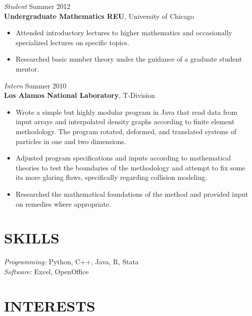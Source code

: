 \documentclass[margin, 10pt]{res} %
\begin{document}
\begin{resume}
{\sl Student} \hfill Summer 2012 \\
\textbf{Undergraduate Mathematics REU}, University of Chicago 
\begin{itemize} 
\item Attended introductory lectures to higher mathematics and occasionally specialized lectures on specific topics.
\item Researched basic number theory under the guidance of a graduate student mentor.  
\end{itemize} 

{\sl Intern} \hfill Summer 2010 \\
\textbf{Los Alamos National Laboratory}, T-Division
\begin{itemize}
\item Wrote a simple but highly modular program in Java that read data from input arrays and interpolated density graphs according to finite element methodology. The program rotated, deformed, and translated systems of particles in one and two dimensions.
\item Adjusted program specifications and inputs according to mathematical theories to test the boundaries of the methodology and attempt to fix some its more glaring flaws, specifically regarding collision modeling. 
\item Researched the mathematical foundations of the method and provided input on remedies where appropriate. 
\end{itemize} 


\section{SKILLS} 

{\sl Programming:} 
Python, C++, Java, R, Stata \\
{\sl Software:} 
Excel, OpenOffice \\


\section{INTERESTS} 


\end{resume}
\end{document}
